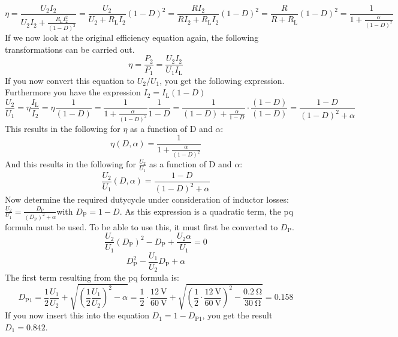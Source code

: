 \begin{solutionblock}
\begin{equation}
    \eta=\frac{U_\mathrm{2}I_\mathrm{2}}{U_\mathrm{2}I_\mathrm{2}+\frac{ R_\mathrm{L}I_\mathrm{2}^2}{(1-D)^2}}=\frac{U_\mathrm{2}}{U_\mathrm{2}+R_\mathrm{L}I_\mathrm{2}}{(1-D)^2}=\frac{RI_\mathrm{2}}{RI_\mathrm{2}+R_\mathrm{L}I_\mathrm{2}}{(1-D)^2}=\frac{R}{R+R_\mathrm{L}}{(1-D)^2}=\frac{1}{1+\frac{\alpha}{(1-D)^2}}
\end{equation}
If we now look at the original efficiency equation again, the following transformations can be carried out.
\begin{equation}
    \eta=\frac{P_\mathrm{2}}{P_\mathrm{1}} = \frac{U_\mathrm{2}I_\mathrm{2}}{U_\mathrm{1}I_\mathrm{L}}
\end{equation}
If you now convert this equation to $U_\mathrm{2}/U_\mathrm{1}$, you get the following expression. Furthermore you have the expression $I_\mathrm{2}=I_\mathrm{L}(1-D)$
\begin{equation}
    \frac{U_\mathrm{2}}{U_\mathrm{1}}=\eta \frac{I_\mathrm{L}}{I_\mathrm{2}}= \eta \frac{1}{(1-D)}=\frac{1}{1+\frac{\alpha}{(1-D)^2}}\frac{1}{1-D}=\frac{1}{(1-D)+\frac{\alpha}{1-D}}\cdot \frac{(1-D)}{(1-D)}=\frac{1-D}{(1-D)^2+\alpha}
\end{equation}
This results in the following for $\eta$ as a function of D and $\alpha$:
\begin{equation}
    \eta(D,\alpha)=\frac{1}{1+\frac{\alpha}{(1-D)^2}}
\end{equation}
And this results in the following for $\frac{U_\mathrm{2}}{U_\mathrm{1}}$ as a function of D and $\alpha$:
\begin{equation}
    \frac{U_\mathrm{2}}{U_\mathrm{1}}(D,\alpha)=\frac{1-D}{(1-D)^2+\alpha}
\end{equation}
Now determine the required dutycycle under consideration of inductor losses:
$\frac{U_\mathrm{2}}{U_\mathrm{1}}=\frac{D_\mathrm{P}}{(D_\mathrm{P})^2+\alpha}$with $D_\mathrm{P}=1-D$.
As this expression is a quadratic term, the pq formula must be used. To be able to use this, it must first be converted to $D_\mathrm{P}$.
\begin{equation}
    \frac{U_\mathrm{2}}{U_\mathrm{1}}(D_\mathrm{P})^2-D_\mathrm{P}+\frac{U_\mathrm{2}\alpha}{U_\mathrm{1}}=0
\end{equation}
\begin{equation}
    D_\mathrm{P}^2 - \frac{U_\mathrm{1}}{U_\mathrm{2}} D_\mathrm{P}+\alpha
\end{equation}
The first term resulting from the pq formula is:
\begin{equation}
    D_\mathrm{P1}=\frac{1}{2}\frac{U_\mathrm{1}}{U_\mathrm{2}}+\sqrt{(\frac{1}{2}\frac{U_\mathrm{1}}{U_\mathrm{2}})^2-\alpha}= \frac{1}{2}\cdot\frac{\SI{12}{\volt}}{\SI{60}{\volt}}+\sqrt{({\frac{1}{2}}\cdot\frac{\SI{12}{\volt}}{\SI{60}{\volt}})^2-\frac{\SI{0.2}{\ohm}}{\SI{30}{\ohm}}}= 0.158
\end{equation}
If you now insert this into the equation $D_\mathrm{1}=1-D_\mathrm{P1}$, you get the result $D_\mathrm{1}=0.842$.


\end{solutionblock}
